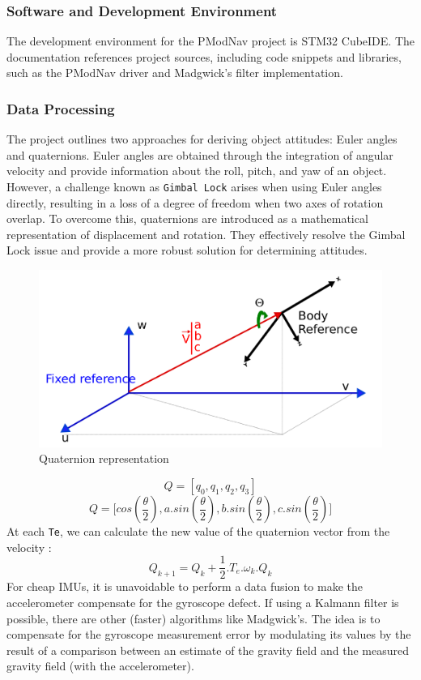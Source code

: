 \subsubsection{Software and Development Environment}
The development environment for the PModNav project is STM32 CubeIDE. The documentation references project sources, including code snippets and libraries, such as the PModNav driver and Madgwick's filter implementation. 

\subsubsection{Data Processing}
The project outlines two approaches for deriving object attitudes: Euler angles and quaternions. Euler angles are obtained through the integration of angular velocity and provide information about the roll, pitch, and yaw of an object. However, a challenge known as \texttt{Gimbal Lock}\cite{gimbal_lock} arises when using Euler angles directly, resulting in a loss of a degree of freedom when two axes of rotation overlap. To overcome this, quaternions are introduced as a mathematical representation of displacement and rotation. They effectively resolve the Gimbal Lock issue and provide a more robust solution for determining attitudes.
\begin{figure}[H]
    \centering
    \includegraphics[width=0.65\linewidth]{./projects/pmodnav/quaternions.png}
    \caption{Quaternion representation}
\end{figure}
$$ Q = [q_0, q_1, q_2, q_3 ] $$
$$ Q = \big[cos(\frac{\theta}{2}), a.sin(\frac{\theta}{2}), b.sin(\frac{\theta}{2}), c.sin(\frac{\theta}{2})\big] $$
At each \texttt{Te}, we can calculate the new value of the quaternion vector from the velocity :
$$ Q_{k+1} = Q_k+\frac{1}{2}.T_e.\omega_k.Q_k $$
For cheap IMUs, it is unavoidable to perform a data fusion to make the accelerometer compensate for the gyroscope defect. If using a Kalmann filter is possible, there are other (faster) algorithms like Madgwick's. The idea is to compensate for the gyroscope measurement error by modulating its values by the result of a comparison between an estimate of the gravity field and the measured gravity field (with the accelerometer).
